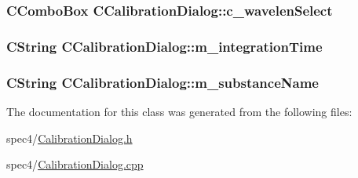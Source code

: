 \label{classCCalibrationDialog_a0a3a4fb91f59ada500e77bac22c3a11a}
\hypertarget{classCCalibrationDialog_a271c77a45d57fad3a49c8783f2f696a2}{
\subsubsection[{c\_\-wavelenSelect}]{\setlength{\rightskip}{0pt plus 5cm}CComboBox {\bf CCalibrationDialog::c\_\-wavelenSelect}}}
\label{classCCalibrationDialog_a271c77a45d57fad3a49c8783f2f696a2}
\hypertarget{classCCalibrationDialog_a69a425629aced9ff506f1335f8ddede1}{
\subsubsection[{m\_\-integrationTime}]{\setlength{\rightskip}{0pt plus 5cm}CString {\bf CCalibrationDialog::m\_\-integrationTime}}}
\label{classCCalibrationDialog_a69a425629aced9ff506f1335f8ddede1}
\hypertarget{classCCalibrationDialog_ac572ac6320283939a210f9d6b17a9647}{
\subsubsection[{m\_\-substanceName}]{\setlength{\rightskip}{0pt plus 5cm}CString {\bf CCalibrationDialog::m\_\-substanceName}}}
\label{classCCalibrationDialog_ac572ac6320283939a210f9d6b17a9647}


The documentation for this class was generated from the following files:\begin{DoxyCompactItemize}
\item 
spec4/\hyperlink{CalibrationDialog_8h}{CalibrationDialog.h}\item 
spec4/\hyperlink{CalibrationDialog_8cpp}{CalibrationDialog.cpp}\end{DoxyCompactItemize}
